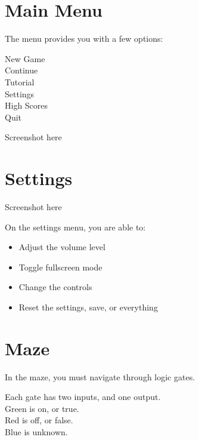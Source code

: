 \documentclass[12pt]{book}
\begin{document}
	\chapter{Main Menu}
		The menu provides you with a few options:
		\begin{description}
			\item[New Game]
			\item[Continue]
			\item[Tutorial]
			\item[Settings]
			\item[High Scores]
			\item[Quit]
		\end{description}
		\newpage
		\begin{center}
			\vspace{2cm}
			\Huge
			Screenshot here		
		\end{center}
	\chapter{Settings}
		\begin{center}
			\vspace{2cm}
			\Huge
			Screenshot here		
		\end{center}
		On the settings menu, you are able to:
		\begin{itemize}
			\item Adjust the volume level
			\item Toggle fullscreen mode
			\item Change the controls
			\item Reset the settings, save, or everything
		\end{itemize}
	\chapter{Maze}
		In the maze, you must navigate through logic gates.

		Each gate has two inputs, and one output.
		\\
		\textcolor{on}{Green is on, or true.}
		\\
		\textcolor{off}{Red is off, or false.}
		\\
		\textcolor{unknown}{Blue is unknown.}
\end{document}
